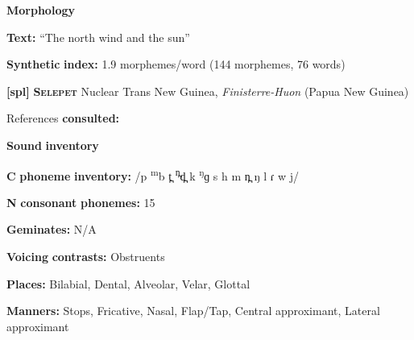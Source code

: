 \documentclass[output=paper]{langsci/langscibook}
\begin{document}
\begin{styleBody}
\textbf{Morphology}
\end{styleBody}

\begin{styleBody}
\textbf{Text:} “The north wind and the sun” \citep[219]{Ridouane2014}
\end{styleBody}

\begin{styleBody}
\textbf{Synthetic} \textbf{index:} 1.9 morphemes/word (144 morphemes, 76 words)
\end{styleBody}

\begin{styleBody}
\textbf{[spl]}   \textbf{\textsc{Selepet}}  Nuclear Trans New Guinea, \textit{Finisterre-Huon} (Papua New Guinea)
\end{styleBody}

\begin{styleBody}
References \textbf{consulted:} \citet{McElhanon1970}
\end{styleBody}

\begin{styleBody}
\textbf{Sound} \textbf{inventory}
\end{styleBody}

\begin{styleBody}
\textbf{C} \textbf{phoneme} \textbf{inventory:} /p \textsuperscript{m}b t̪ \textsuperscript{n̪}d̪ k \textsuperscript{ŋ}ɡ s h m n̪ ŋ l ɾ w j/
\end{styleBody}

\begin{styleBody}
\textbf{N} \textbf{consonant} \textbf{phonemes:} 15
\end{styleBody}

\begin{styleBody}
\textbf{Geminates:} N/A
\end{styleBody}

\begin{styleBody}
\textbf{Voicing} \textbf{contrasts:} Obstruents
\end{styleBody}

\begin{styleBody}
\textbf{Places:} Bilabial, Dental, Alveolar, Velar, Glottal
\end{styleBody}

\begin{styleBody}
\textbf{Manners:} Stops, Fricative, Nasal, Flap/Tap, Central approximant, Lateral approximant
\end{styleBody}
\end{document}
